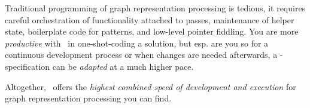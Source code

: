 Traditional programming of graph representation processing is tedious, it requires careful orchestration of functionality attached to passes, maintenance of helper state, boilerplate code for patterns, and low-level pointer fiddling.
You are more \emph{productive} with \GrG\ in one-shot-coding a solution, but esp. are you so for a continuous development process or when changes are needed afterwards, a \GrG-specification can be \emph{adapted} at a much higher pace.

Altogether, \GrG\ offers the \emph{highest combined speed of development and execution} for graph representation processing you can find.


